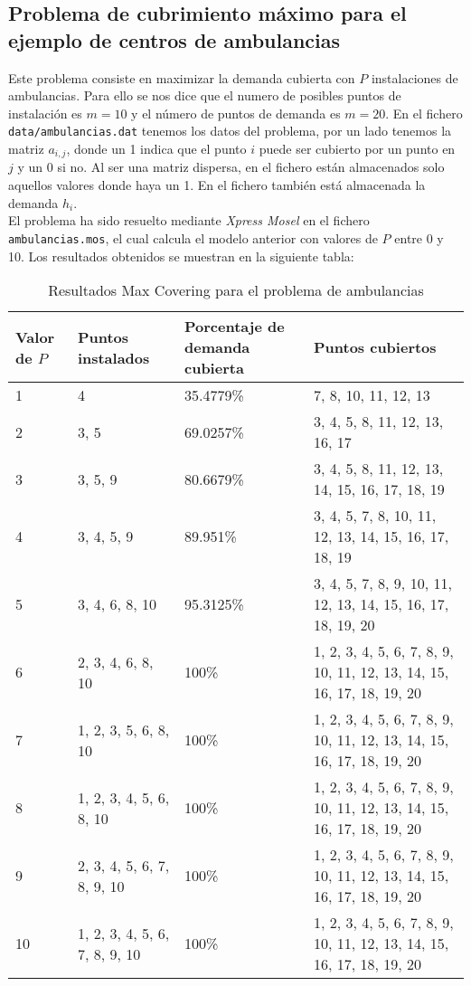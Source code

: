 \documentclass[a4paper,11pt]{article}
\begin{document}
\newpage
\subsection{Problema de cubrimiento máximo para el ejemplo de centros de ambulancias}

Este problema consiste en maximizar la demanda cubierta con ${P}$ instalaciones de ambulancias. Para ello se nos dice que el numero de posibles puntos de instalación es ${m=10}$ y el número de puntos de demanda es ${m=20}$. En el fichero \texttt{data/ambulancias.dat} tenemos los datos del problema, por un lado tenemos la matriz ${a_{i,j}}$, donde un 1 indica que el punto ${i}$ puede ser cubierto por un punto en ${j}$ y un 0 si no. Al ser una matriz dispersa, en el fichero están almacenados solo aquellos valores donde haya un 1. En el fichero también está almacenada la demanda ${h_i}$.\\

El problema ha sido resuelto mediante \textit{Xpress Mosel} en el fichero \texttt{ambulancias.mos}, el cual calcula el modelo anterior con valores de ${P}$ entre 0 y 10. Los resultados obtenidos se muestran en la siguiente tabla:

\begin{table}[!htbp]
\label{4_max_ambulancias}
\centering
\begin{tabular}{|l|l|p{3cm}|p{5cm}|}
\hline
Valor de ${P}$	& Puntos instalados  & Porcentaje de demanda cubierta	& Puntos cubiertos	\\ \hline
1	& 4								& 35.4779\%	& 7, 8, 10, 11, 12, 13													\\ \hline
2	& 3, 5							& 69.0257\%	& 3, 4, 5, 8, 11, 12, 13, 16, 17										\\ \hline
3	& 3, 5, 9						& 80.6679\%	& 3, 4, 5, 8, 11, 12, 13, 14, 15, 16, 17, 18, 19						\\ \hline
4	& 3, 4, 5, 9					& 89.951\%	& 3, 4, 5, 7, 8, 10, 11, 12, 13, 14, 15, 16, 17, 18, 19					\\ \hline
5	& 3, 4, 6, 8, 10				& 95.3125\%	& 3, 4, 5, 7, 8, 9, 10, 11, 12, 13, 14, 15, 16, 17, 18, 19, 20			\\ \hline
6	& 2, 3, 4, 6, 8, 10				& 100\%		& 1, 2, 3, 4, 5, 6, 7, 8, 9, 10, 11, 12, 13, 14, 15, 16, 17, 18, 19, 20	\\ \hline
7	& 1, 2, 3, 5, 6, 8, 10			& 100\%		& 1, 2, 3, 4, 5, 6, 7, 8, 9, 10, 11, 12, 13, 14, 15, 16, 17, 18, 19, 20	\\ \hline
8	& 1, 2, 3, 4, 5, 6, 8, 10		& 100\%		& 1, 2, 3, 4, 5, 6, 7, 8, 9, 10, 11, 12, 13, 14, 15, 16, 17, 18, 19, 20	\\ \hline
9	& 2, 3, 4, 5, 6, 7, 8, 9, 10	& 100\%		& 1, 2, 3, 4, 5, 6, 7, 8, 9, 10, 11, 12, 13, 14, 15, 16, 17, 18, 19, 20	\\ \hline
10	& 1, 2, 3, 4, 5, 6, 7, 8, 9, 10	& 100\%		& 1, 2, 3, 4, 5, 6, 7, 8, 9, 10, 11, 12, 13, 14, 15, 16, 17, 18, 19, 20	\\ \hline
\end{tabular}
\caption{Resultados Max Covering para el problema de ambulancias}
\end{table}
\end{document}
